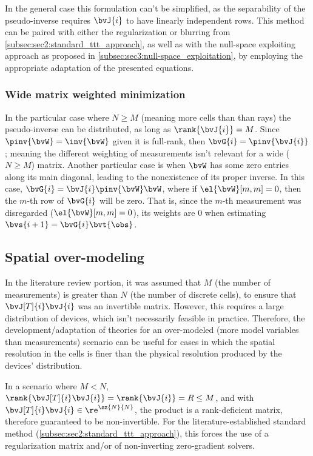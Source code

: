 In the general case this formulation can't be simplified, as the separability of the pseudo-inverse requires $\bvJ{i}$ to have linearly independent rows. This method can be paired with either the regularization or blurring from \cref{subsec:sec2:standard_ttt_approach}, as well as with the null-space exploiting approach as proposed in \cref{subsec:sec3:null-space_exploitation}, by employing the appropriate adaptation of the presented equations.

\subsubsection{Wide matrix weighted minimization}

In the particular case where $N \geq M$ (meaning more cells than than rays) the pseudo-inverse can be distributed, as long as $\rank{\bvJ{i}} = M$. Since $\pinv{\bvW} = \inv{\bvW}$ given it is full-rank, then $\bvG{i} = \pinv{\bvJ{i}}$; meaning the different weighting of measurements isn't relevant for a wide ($N \geq M$) matrix. Another particular case is when $\bvW$ has some zero entries along its main diagonal, leading to the nonexistence of its proper inverse. In this case, $\bvG{i} = \bvJ{i} \pinv{\bvW} \bvW$, where if $\el{\bvW}[m,m] = 0$, then the $m$-th row of $\bvG{i}$ will be zero. That is, since the $m$-th measurement was disregarded ($\el{\bvW}[m,m] = 0$), its weights are $0$ when estimating $\bvs{i+1} = \bvG{i} \bvt{\obs}$.

\subsection{Spatial over-modeling}
\label{subsec:sec4:spatial_over-modeling}

In the literature review portion, it was assumed that $M$ (the number of measurements) is greater than $N$ (the number of discrete cells), to ensure that $\bvJ[T]{i} \bvJ{i}$ was an invertible matrix. However, this requires a large distribution of devices, which isn't necessarily feasible in practice. Therefore, the development/adaptation of theories for an over-modeled (more model variables than measurements) scenario can be useful for cases in which the spatial resolution in the cells is finer than the physical resolution produced by the devices' distribution.

In a scenario where $M < N$,  $\rank{\bvJ[T]{i} \bvJ{i}} = \rank{\bvJ{i}} = R \leq M$, and with $\bvJ[T]{i} \bvJ{i} \in \re^{\sz{N}{N}}$, the product is a rank-deficient matrix, therefore guaranteed to be non-invertible. For the literature-established standard method (\cref{subsec:sec2:standard_ttt_approach}), this forces the use of a regularization matrix and/or of non-inverting zero-gradient solvers.


